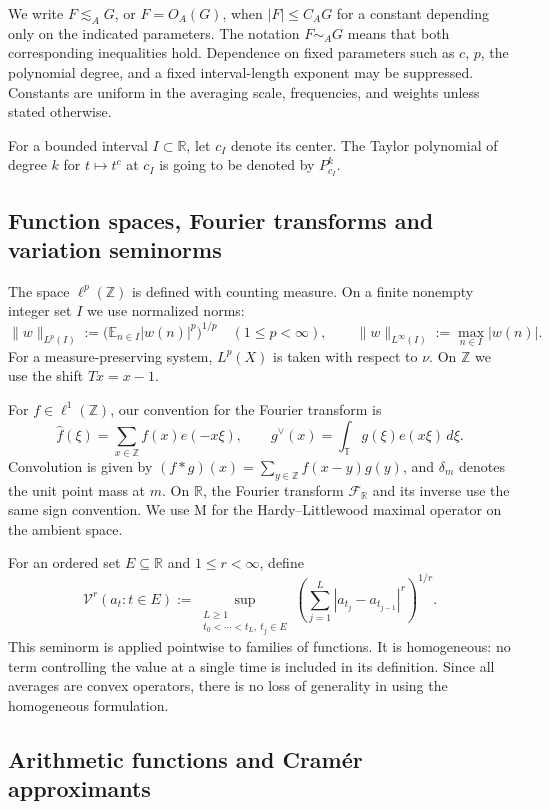 \documentclass[10pt,leqno]{amsart}
\def\R {\mathbb{R}}
\numberwithin{equation}{section}
\numberwithin{counter2}{section}
\theoremstyle{definition}
\theoremstyle{plain}
\begin{document}
 We write $F\lesssim_{A}G$, or
	$F=O_{A}(G)$, when $|F|\le C_{A}G$ for a
	constant depending only on the indicated parameters.
	The notation $F \sim_AG$ means that both corresponding
	inequalities hold. Dependence on fixed parameters such as $c$, $p$,
	the polynomial degree, and a fixed interval-length exponent may be
	suppressed. Constants are uniform in the averaging scale,
	frequencies, and weights unless stated otherwise.
	
	For a bounded interval $I\subset \R$, let $c_I$ denote its center.
	The Taylor polynomial of degree $k$ for $t\mapsto t^c$ at $c_I$ is going to be denoted by $P_{c_I}^k.$

	
	\subsection{Function spaces, Fourier transforms and variation seminorms}
	
	The space $\ell^p(\mathbb Z)$ is defined with counting measure.
	On a finite nonempty integer set $I$ we use normalized norms:
	\[
	\|w\|_{L^p(I)}:=
	\bigl(\mathbb E_{n\in I}|w(n)|^p\bigr)^{1/p}
	\quad(1\le p<\infty),\qquad
	\|w\|_{L^\infty(I)}:=\max_{n\in I}|w(n)|.
	\]
	For a measure-preserving system, $L^p(X)$ is taken with respect to
	$\nu$. 
	On $\mathbb Z$ we use the shift $Tx=x-1$.
	
	For $f\in\ell^1(\mathbb Z)$, our convention for the Fourier transform is
	\[
	\widehat f(\xi)=\sum_{x\in\mathbb Z}f(x)e(-x\xi),
	\qquad
	g^\vee(x)=\int_{\mathbb T}g(\xi)e(x\xi)\,d\xi.
	\]
	Convolution is given by
	$(f*g)(x)=\sum_{y\in\mathbb Z}f(x-y)g(y)$, and $\delta_m$
	denotes the unit point mass at $m$. On $\mathbb R$, the Fourier
	transform $\mathcal F_{\mathbb R}$ and its inverse use the same
	sign convention. We use
	$\mathrm M$ for the Hardy--Littlewood maximal operator on the
	ambient space.
	
	For an ordered set $E\subseteq\mathbb R$ and $1\le r<\infty$,
	define
	\[
	\mathcal V^r(a_t:t\in E)
	:=\sup_{\substack{L\ge1\\t_0<\cdots<t_L,\ t_j\in E}}
	\left(\sum_{j=1}^L|a_{t_j}-a_{t_{j-1}}|^r\right)^{1/r}.
	\]
	This seminorm is applied pointwise to families of functions. It is
	homogeneous: no term controlling the value at a single time is
	included in its definition. Since all averages are convex operators, there is no loss of generality in using the homogeneous formulation.
	
	\subsection{Arithmetic functions and Cram\'er approximants}
	
\end{document}
